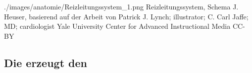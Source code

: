 {./images/anatomie/Reizleitungssystem_1.png}%
{Reizleitungssystem, Schema}%
{}%
{J. Heuser,
basierend auf der Arbeit von Patrick J. Lynch; illustrator;
C. Carl Jaffe; MD; cardiologist Yale University Center for
Advanced Instructional Media}%
{CC-BY}%

\begin{Synopsis}
\end{Synopsis}

\subsection{Die  erzeugt den  }

